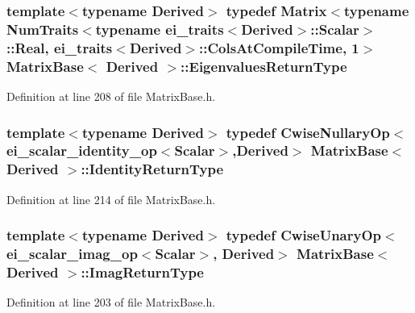 \hypertarget{class_matrix_base_ab041ffd1da23ffd76ad673bd73426d38}{
\subsubsection[{Eigenvalues\-Return\-Type}]{\setlength{\rightskip}{0pt plus 5cm}template$<$typename Derived$>$ typedef {\bf Matrix}$<$typename {\bf Num\-Traits}$<$typename {\bf ei\-\_\-traits}$<$Derived$>$\-::{\bf Scalar}$>$\-::Real, {\bf ei\-\_\-traits}$<$Derived$>$\-::{\bf Cols\-At\-Compile\-Time}, 1$>$ {\bf Matrix\-Base}$<$ Derived $>$\-::{\bf Eigenvalues\-Return\-Type}}}\label{class_matrix_base_ab041ffd1da23ffd76ad673bd73426d38}


Definition at line 208 of file Matrix\-Base.\-h.

\hypertarget{class_matrix_base_a2131370fa10c308c9a39fab0c81ebcd1}{
\subsubsection[{Identity\-Return\-Type}]{\setlength{\rightskip}{0pt plus 5cm}template$<$typename Derived$>$ typedef {\bf Cwise\-Nullary\-Op}$<${\bf ei\-\_\-scalar\-\_\-identity\-\_\-op}$<${\bf Scalar}$>$,Derived$>$ {\bf Matrix\-Base}$<$ Derived $>$\-::{\bf Identity\-Return\-Type}}}\label{class_matrix_base_a2131370fa10c308c9a39fab0c81ebcd1}


Definition at line 214 of file Matrix\-Base.\-h.

\hypertarget{class_matrix_base_a68872f4e92191ab5c7d927329aa6d53c}{
\subsubsection[{Imag\-Return\-Type}]{\setlength{\rightskip}{0pt plus 5cm}template$<$typename Derived$>$ typedef {\bf Cwise\-Unary\-Op}$<${\bf ei\-\_\-scalar\-\_\-imag\-\_\-op}$<${\bf Scalar}$>$, Derived$>$ {\bf Matrix\-Base}$<$ Derived $>$\-::{\bf Imag\-Return\-Type}}}\label{class_matrix_base_a68872f4e92191ab5c7d927329aa6d53c}


Definition at line 203 of file Matrix\-Base.\-h.

